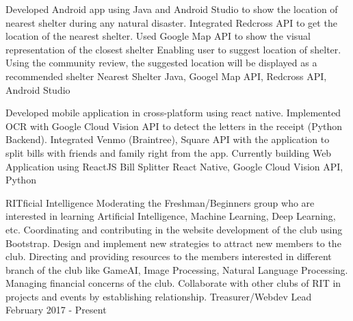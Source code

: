 \documentclass[]{awesome-cv}
\begin{document}
\vspace{-7mm}
\begin{cventries}
	\cventry
	{Developed Android app using Java and Android Studio to show the location of nearest shelter during any natural disaster. Integrated Redcross API to get the location of the nearest shelter. Used Google Map API to show the visual representation of the closest shelter Enabling user to suggest location of shelter. Using the community review, the suggested location will be displayed as a recommended shelter}
	{Nearest Shelter}
	{Java, Googel Map API, Redcross API, Android Studio}
	{}
	{}
	
	\vspace{-5mm}
	\cventry
	{Developed mobile application in cross-platform using react native. Implemented OCR with Google Cloud Vision API to detect the letters in the receipt (Python Backend). Integrated Venmo (Braintree), Square API with the application to split bills with friends and family right from the app. Currently building Web Application using ReactJS}
	{Bill Splitter}
	{React Native, Google Cloud Vision API, Python}
	{}
	{}
	
	\vspace{-5mm}
\end{cventries}
\begin{cvhonors}
	\cvhonor
	{RITficial Intelligence}
	{Moderating the Freshman/Beginner\textquotesingle{}s group who are interested in learning Artificial Intelligence, Machine Learning, Deep Learning, etc. Coordinating and contributing in the website development of the club using Bootstrap. Design and implement new strategies to attract new members to the club. Directing and providing resources to the members interested in different branch of the club like GameAI, Image Processing, Natural Language Processing. Managing financial concerns of the club. Collaborate with other clubs of RIT in projects and events by establishing relationship.}
	{Treasurer/Webdev Lead}
	{February 2017 - Present}
\end{cvhonors}
\ 
\end{document}
